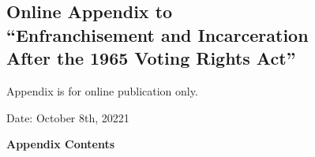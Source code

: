 \documentclass[12pt]{article}
\begin{document}
\singlespacing
\clearpage
\newpage









\clearpage
\newpage
\normalsize

\appendix




\clearpage

\begin{center}
\singlespacing
	\section*{\normalfont \LARGE Online Appendix to \\``Enfranchisement and Incarceration \\ After the 1965 Voting Rights Act''}

	\normalsize
	\vspace{.2in}
	{Appendix is for online publication only.}


	\large
	\vspace{.25in}
	Date: October 8th, 20221

\end{center}


\vspace{.4in}
\singlespacing
\normalsize

\setcounter{footnote}{0}
\setcounter{equation}{0}

\renewcommand{\thesubsection}{\Alph{subsection}}

\singlespacing
\noindent \textbf{Appendix Contents} \\
\end{document}
